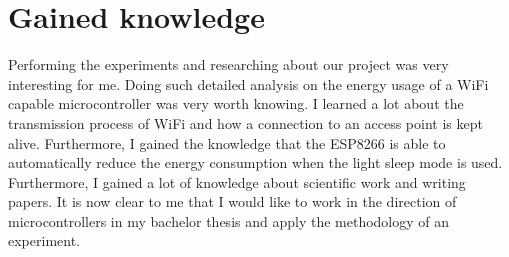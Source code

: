 \section*{Gained knowledge}
Performing the experiments and researching about our project was very interesting for me. Doing such detailed analysis on the energy usage of a WiFi capable microcontroller was very worth knowing. I learned a lot about the transmission process of WiFi and how a connection to an access point is kept alive. Furthermore, I gained the knowledge that the ESP8266 is able to automatically reduce the energy consumption when the light sleep mode is used. Furthermore, I gained a lot of knowledge about scientific work and writing papers.
It is now clear to me that I would like to work in the direction of microcontrollers in my bachelor thesis and apply the methodology of an experiment. 

